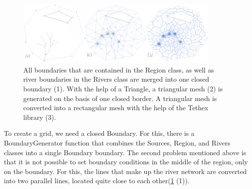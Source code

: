 \documentclass[]{pracamgr}
\begin{document}
      \begin{figure}[H]
        \centering
        \includegraphics[width=0.9\textwidth]{figs/mesh_generation.png}        
        \caption{All boundaries that are contained in the Region class, as well as river boundaries in the Rivers class are merged into one closed boundary (1). With the help of a Triangle, a triangular mesh (2) is generated on the basis of one closed border. A triangular mesh is converted into a rectangular mesh with the help of the Tethex library (3).}
        \label{mesh_generation}
      \end{figure}

      To create a grid, we need a closed Boundary. For this, there is a BoundaryGenerator function that combines the Sources, Region, and Rivers classes into a single Boundary boundary. The second problem mentioned above is that it is not possible to set boundary conditions in the middle of the region, only on the boundary. For this, the lines that make up the river network are converted into two parallel lines, located quite close to each other(\ref{mesh_generation} (1)).
\end{document}
